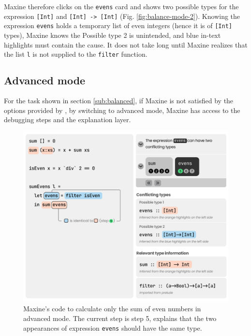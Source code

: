 Maxine therefore clicks on the \texttt{evens} card and \chameleon{} shows two
possible types for the expression \texttt{[Int]} and \texttt{[Int] -> [Int]}
(Fig. \ref{fig:balance-mode-2}). Knowing the expression \texttt{evens} holds
a temporary list of even integers (hence it is of \texttt{[Int]} types), Maxine
knows the Possible type 2 is unintended, and blue in-text highlights must
contain the cause. It does not take long until Maxine realizes that the list 
\texttt{l} is not supplied to the \texttt{filter} function.


\subsection{Advanced mode}  \label{sub:advanced}


For the task shown in section \ref{sub:balanced}, if Maxine is not satisfied by
the options provided by \chameleon{}, by switching to advanced
mode, Maxine has access to the debugging steps and the explanation layer. 

\begin{figure}
        \centering
        \includegraphics[width=\linewidth]{images/advanced-mode-1.pdf}
        \caption{
            Maxine's code to calculate only the sum 
            of even numbers in advanced mode. 
            The current step is step 5, \chameleon{} 
            explains that the two appearances of expression 
            \texttt{evens} should have the same type.
        }
        \label{fig:advanced-mode-step5}
\end{figure}

